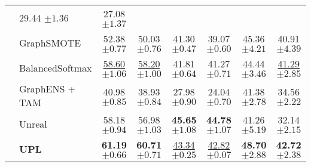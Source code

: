 \begin{table*}[ht!]
\begin{center}
\begin{scriptsize}
{\begin{tabular}{@{}rlcc|cc|cc@{}}
                     & 29.44 \tiny{$\pm 1.36$}& 27.08 \tiny{$\pm 1.37$}
                     \\
                     
                     & GraphSMOTE \cite{zhao2021graphsmote}
                     & 52.38 \tiny{$\pm 0.77$}& 50.03 \tiny{$\pm 0.76$}
                     & 41.30 \tiny{$\pm 0.47$}& 39.07 \tiny{$\pm 0.60$}
                     & 45.36 \tiny{$\pm 4.21$}& 40.91 \tiny{$\pm 4.39$}
                     \\
                     
                     
                     & BalancedSoftmax \cite{ren2020balanced}
                     & \underline{58.60} \tiny{$\pm 1.06$} & \underline{58.20} \tiny{$\pm 1.00$}
                     & 41.81 \tiny{$\pm 0.64$} & 41.27 \tiny{$\pm 0.71$}
                     & \underline{}{44.44} \tiny{$\pm 3.46$} & \underline{41.29} \tiny{$\pm 2.85$} \\
                     
                     & GraphENS \cite{park2022graphens}+ TAM \cite{song2022tam}
                     & 40.98 \tiny{$\pm 0.85$} & 38.93 \tiny{$\pm 0.84$}
                     & 27.98 \tiny{$\pm 0.90$} & 24.04 \tiny{$\pm 0.70$}
                     & 41.38 \tiny{$\pm 2.78$} & 34.56 \tiny{$\pm 2.22$} \\

                     & Unreal
                     & 58.18 \tiny{$\pm 0.94$} & 56.98 \tiny{$\pm 1.03$}
                     & \textbf{45.65} \tiny{$\pm 1.08$} & \textbf{44.78} \tiny{$\pm 1.07$}
                     & 41.26 \tiny{$\pm 5.19$} & 32.14 \tiny{$\pm 2.15$}\\

                     
                     \cline{1-8}
                     & \textbf{UPL}
                     & \textbf{61.19} \tiny{$\pm 0.66$} & \textbf{60.71} \tiny{$\pm 0.71$}
                     & \underline{43.34} \tiny{$\pm 0.25$} & \underline{42.82} \tiny{$\pm 0.07$}
                     & \textbf{48.70} \tiny{$\pm 2.88$} & \textbf{42.72} \tiny{$\pm 2.38$} \\

                     
\bottomrule
\end{tabular}}

\end{scriptsize}
\end{center}
\label{tb:main_chart_hetero}
\vspace{-0.05in}
\end{table*}



